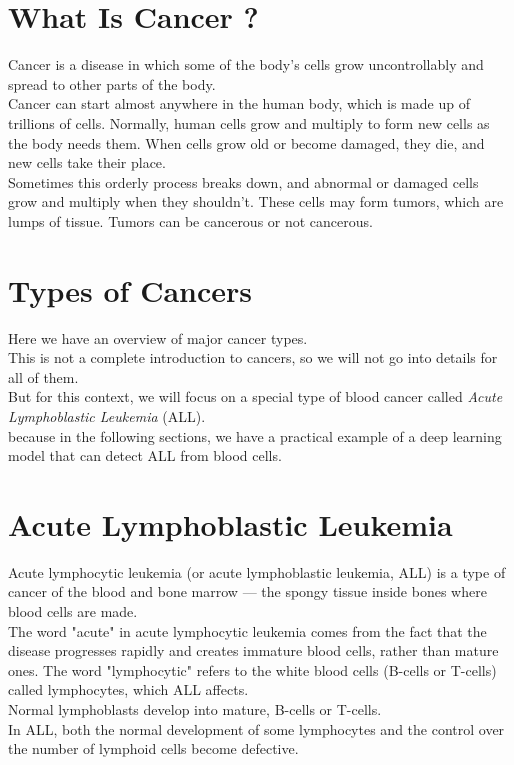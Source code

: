 \documentclass{SBCbookchapter}
\begin{document}
\section*{What Is Cancer ?}
Cancer is a disease in which some of the body’s 
cells grow uncontrollably and spread to other parts of the body. \\ 
Cancer can start almost anywhere in the human body, 
which is made up of trillions of cells. Normally, 
human cells grow and multiply to form new cells as the 
body needs them. When cells grow old or become 
damaged, they die, and new cells take their place. \\
Sometimes this orderly process breaks down, and
abnormal or damaged cells grow and multiply when
they shouldn’t. These cells may form tumors, which
are lumps of tissue. Tumors can be cancerous or
not cancerous. 

\section*{Types of Cancers}
Here we have an overview of major cancer types. \\
This is not a complete introduction to cancers, 
so we will not go into details for all of them. \\
But for this context, we will focus on a special type of blood cancer
called \textit{Acute Lymphoblastic Leukemia} (ALL). \\
because in the following sections, we have a practical example
of a deep learning model that can detect ALL from blood cells.

\section*{Acute Lymphoblastic Leukemia}
Acute lymphocytic leukemia (or acute lymphoblastic leukemia, ALL)
is a type of cancer of the blood and bone marrow — 
the spongy tissue inside bones where blood cells are made. \\
The word "acute" in acute lymphocytic leukemia comes
from the fact that the disease progresses rapidly and
creates immature blood cells, rather than mature ones.
The word "lymphocytic" 
refers to the white blood cells (B-cells or T-cells) called lymphocytes, 
which ALL affects. \\
Normal lymphoblasts develop into mature, B-cells or T-cells.\\
In ALL, both the normal development of some 
lymphocytes and the control over the number of 
lymphoid cells become defective.
\end{document}
